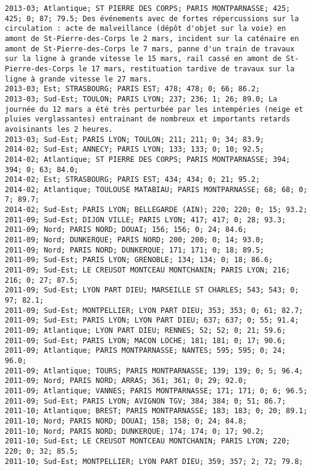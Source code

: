 \documentclass{article}
\begin{document}
\begin{Verbatim}[commandchars=\\\{\}]
2013-03; Atlantique; ST PIERRE DES CORPS; PARIS MONTPARNASSE; 425; 425; 0; 87; 79.5; Des événements avec de fortes répercussions sur la circulation : acte de malveillance (dépôt d'objet sur la voie) en amont de St-Pierre-des-Corps le 2 mars, incident sur la caténaire en amont de St-Pierre-des-Corps le 7 mars, panne d'un train de travaux sur la ligne à grande vitesse le 15 mars, rail cassé en amont de St-Pierre-des-Corps le 17 mars, restituation tardive de travaux sur la ligne à grande vitesse le 27 mars.
2013-03; Est; STRASBOURG; PARIS EST; 478; 478; 0; 66; 86.2; 
2013-03; Sud-Est; TOULON; PARIS LYON; 237; 236; 1; 26; 89.0; La journée du 12 mars a été très perturbée par les intempéries (neige et pluies verglassantes) entrainant de nombreux et importants retards avoisinants les 2 heures.
2013-03; Sud-Est; PARIS LYON; TOULON; 211; 211; 0; 34; 83.9; 
2014-02; Sud-Est; ANNECY; PARIS LYON; 133; 133; 0; 10; 92.5; 
2014-02; Atlantique; ST PIERRE DES CORPS; PARIS MONTPARNASSE; 394; 394; 0; 63; 84.0; 
2014-02; Est; STRASBOURG; PARIS EST; 434; 434; 0; 21; 95.2; 
2014-02; Atlantique; TOULOUSE MATABIAU; PARIS MONTPARNASSE; 68; 68; 0; 7; 89.7; 
2014-02; Sud-Est; PARIS LYON; BELLEGARDE (AIN); 220; 220; 0; 15; 93.2; 
2011-09; Sud-Est; DIJON VILLE; PARIS LYON; 417; 417; 0; 28; 93.3; 
2011-09; Nord; PARIS NORD; DOUAI; 156; 156; 0; 24; 84.6; 
2011-09; Nord; DUNKERQUE; PARIS NORD; 200; 200; 0; 14; 93.0; 
2011-09; Nord; PARIS NORD; DUNKERQUE; 171; 171; 0; 18; 89.5; 
2011-09; Sud-Est; PARIS LYON; GRENOBLE; 134; 134; 0; 18; 86.6; 
2011-09; Sud-Est; LE CREUSOT MONTCEAU MONTCHANIN; PARIS LYON; 216; 216; 0; 27; 87.5; 
2011-09; Sud-Est; LYON PART DIEU; MARSEILLE ST CHARLES; 543; 543; 0; 97; 82.1; 
2011-09; Sud-Est; MONTPELLIER; LYON PART DIEU; 353; 353; 0; 61; 82.7; 
2011-09; Sud-Est; PARIS LYON; LYON PART DIEU; 637; 637; 0; 55; 91.4; 
2011-09; Atlantique; LYON PART DIEU; RENNES; 52; 52; 0; 21; 59.6; 
2011-09; Sud-Est; PARIS LYON; MACON LOCHE; 181; 181; 0; 17; 90.6; 
2011-09; Atlantique; PARIS MONTPARNASSE; NANTES; 595; 595; 0; 24; 96.0; 
2011-09; Atlantique; TOURS; PARIS MONTPARNASSE; 139; 139; 0; 5; 96.4; 
2011-09; Nord; PARIS NORD; ARRAS; 361; 361; 0; 29; 92.0; 
2011-09; Atlantique; VANNES; PARIS MONTPARNASSE; 171; 171; 0; 6; 96.5; 
2011-09; Sud-Est; PARIS LYON; AVIGNON TGV; 384; 384; 0; 51; 86.7; 
2011-10; Atlantique; BREST; PARIS MONTPARNASSE; 183; 183; 0; 20; 89.1; 
2011-10; Nord; PARIS NORD; DOUAI; 158; 158; 0; 24; 84.8; 
2011-10; Nord; PARIS NORD; DUNKERQUE; 174; 174; 0; 17; 90.2; 
2011-10; Sud-Est; LE CREUSOT MONTCEAU MONTCHANIN; PARIS LYON; 220; 220; 0; 32; 85.5; 
2011-10; Sud-Est; MONTPELLIER; LYON PART DIEU; 359; 357; 2; 72; 79.8; 

\end{Verbatim}
\end{document}
